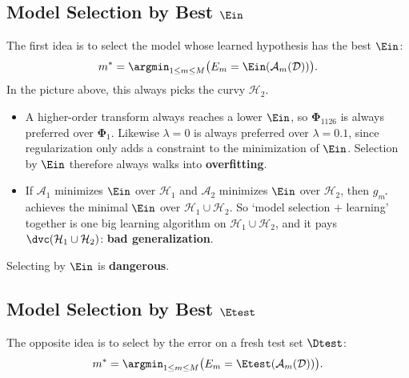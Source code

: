 \subsection{Model Selection by Best \texorpdfstring{\(\Ein\)}{Ein}}

The first idea is to select the model whose learned hypothesis has the best
\(\Ein\):
\[
    m^* = \argmin_{1 \le m \le M} \bigl( E_m = \Ein(\mathcal{A}_m(\mathcal{D}))
    \bigr) .
\]
In the picture above, this always picks the curvy \(\mathcal{H}_2\).
\begin{itemize}
    \item A higher-order transform always reaches a lower \(\Ein\), so
        \(\bm{\Phi}_{1126}\) is always preferred over \(\bm{\Phi}_1\).
        Likewise \(\lambda = 0\) is always preferred over \(\lambda = 0.1\),
        since regularization only adds a constraint to the minimization of
        \(\Ein\). Selection by \(\Ein\) therefore always walks into
        \textbf{overfitting}.
    \item If \(\mathcal{A}_1\) minimizes \(\Ein\) over \(\mathcal{H}_1\) and
        \(\mathcal{A}_2\) minimizes \(\Ein\) over \(\mathcal{H}_2\), then
        \(g_{m^*}\) achieves the minimal \(\Ein\) over \(\mathcal{H}_1 \cup
        \mathcal{H}_2\). So `model selection \(+\) learning' together is one
        big learning algorithm on \(\mathcal{H}_1 \cup \mathcal{H}_2\), and it
        pays \(\dvc(\mathcal{H}_1 \cup \mathcal{H}_2)\): \textbf{bad
        generalization}.
\end{itemize}

\begin{moral}
    Selecting by \(\Ein\) is \textbf{dangerous}.
\end{moral}

\subsection{Model Selection by Best \texorpdfstring{\(\Etest\)}{Etest}}

The opposite idea is to select by the error on a fresh test set
\(\Dtest\):
\[
    m^* = \argmin_{1 \le m \le M} \bigl( E_m =
    \Etest(\mathcal{A}_m(\mathcal{D})) \bigr) .
\]

